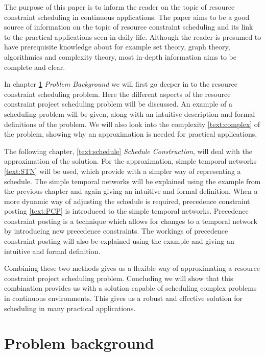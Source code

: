 \documentclass{article}
\theoremstyle{definition}
\begin{document}
The purpose of this paper is to inform the reader on the topic of resource constraint scheduling in continuous applications.
The paper aims to be a good source of information on the topic of resource constraint scheduling and its link to the practical applications seen in daily life.
Although the reader is presumed to have prerequisite knowledge about for example set theory, graph theory, algorithmics and complexity theory, most in-depth information aims to be complete and clear.

In  chapter \ref{text:problem_background} \emph{Problem Background} we will first go deeper in to the resource constraint scheduling problem.
Here the different aspects of the resource constraint project scheduling problem will be discussed.
An example of a scheduling problem will be given, along with an intuitive description and formal definitions of the problem.
We will also look into the complexity \ref{text:complex} of the problem, showing why an approximation is needed for practical applications.

The following chapter, \ref{text:schedule} \emph{Schedule Construction}, will deal with the approximation of the solution.
For the approximation, simple temporal networks \ref{text:STN} will be used, which provide with a simpler way of representing a schedule.
The simple temporal networks will be explained using the example from the previous chapter and again giving an intuitive and formal definition.
When a more dynamic way of adjusting the schedule is required, precedence constraint posting \ref{text:PCP} is introduced to the simple temporal networks.
Precedence constraint posting is a technique which allows for changes to a temporal network by introducing new precedence constraints.
The workings of precedence constraint posting will also be explained using the example and giving an intuitive and formal definition.

Combining these two methods gives us a flexible way of approximating a resource constraint project scheduling problem.
Concluding we will show that this combination provides us with a solution capable of scheduling complex problems in continuous environments.
This gives us a robust and effective solution for scheduling in many practical applications.


\newpage


\section{Problem background}
\label{text:problem_background}
\end{document}
